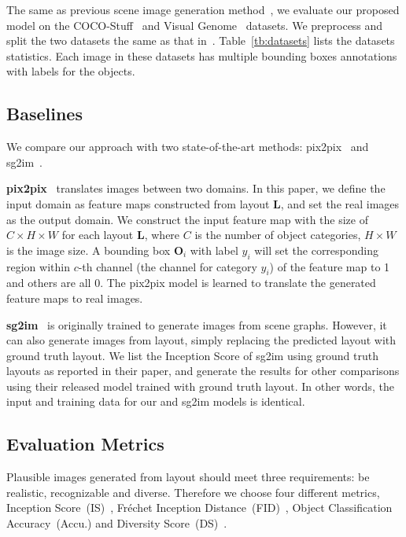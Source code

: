\documentclass[10pt,twocolumn,letterpaper]{article}
\begin{document}
The same as previous scene image generation method~\cite{Johnson2018}, we evaluate our proposed model on the COCO-Stuff~\cite{caesar2016coco} and Visual Genome~\cite{krishna2017visual} datasets. We preprocess and split the two datasets the same as that in~\cite{Johnson2018}. Table~\ref{tb:datasets} lists the datasets statistics. Each image in these datasets has multiple bounding boxes annotations with labels for the objects.




\subsection{Baselines}
We compare our approach with two state-of-the-art methods: pix2pix~\cite{isola2017image} and sg2im~\cite{Johnson2018}.

\vspace{0.05in}
\noindent\textbf{pix2pix}~\cite{isola2017image} translates images between two domains. 
In this paper, we define the input domain as feature maps constructed from layout $\mathbf{L}$, and set the real images as the output domain.
We construct the input feature map with the size of $C\times H\times W$ for each layout $\mathbf{L}$, where $C$ is the number of object categories, $H\times W$ is the image size. 
A bounding box $\mathbf{O}_i$ with label $y_i$ will set the corresponding region within $c$-th channel (the channel for category $y_i$) of the feature map to 1 and others are all 0.
The pix2pix model is learned to translate the generated feature maps to real images.

\noindent\textbf{sg2im}~\cite{Johnson2018} is originally trained to generate images from scene graphs. 
However, it can also generate images from layout, simply replacing the predicted layout with ground truth layout. 
We list the Inception Score of sg2im using ground truth layouts as reported in their paper, and generate the results for other comparisons using their released model trained with ground truth layout. In other words, the input and training data for our and sg2im models is identical. 

\subsection{Evaluation Metrics}
Plausible images generated from layout should meet three requirements: be realistic, recognizable and diverse. Therefore we choose four different metrics, Inception Score~(IS)~\cite{salimans2016improved}, Fr\'echet Inception Distance~(FID)~\cite{Heusel2017}, Object Classification Accuracy~(Accu.) and Diversity Score~(DS)~\cite{zhang2018unreasonable}.
\end{document}
